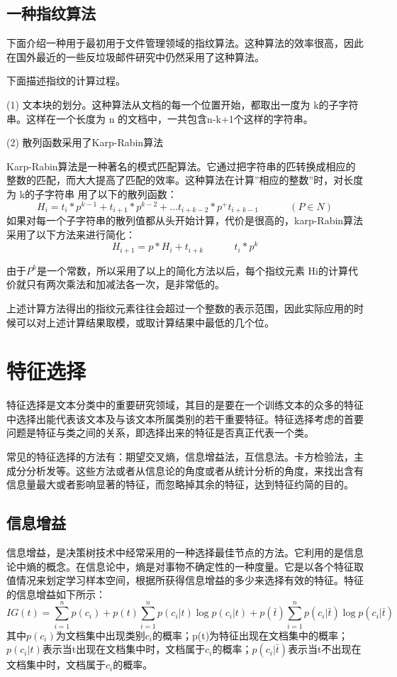 \subsection{一种指纹算法}

下面介绍一种用于最初用于文件管理领域的指纹算法。这种算法的效率很高，因此在国外最近的一些反垃圾邮件研究中仍然采用了这种算法。

下面描述指纹的计算过程。

 (1) 文本块的划分。这种算法从文档的每一个位置开始，都取出一度为 k的子字符串。这样在一个长度为 n 的文档中，一共包含n-k+1个这样的字符串。
 
(2) 散列函数采用了Karp-Rabin算法\cite{Karp1987Efficient}

  Karp-Rabin算法是一种著名的模式匹配算法。它通过把字符串的匹转换成相应的整数的匹配，而大大提高了匹配的效率。这种算法在计算”相应的整数”时，对长度为 k的子字符串 用了以下的散列函数：
\begin{equation}
 H_i=t_i*p^{k-1}+t_{i+1}*p^{k-2}+...t_{i+k-2}*p^+t_{i+k-1} ~~~~~~~~~~~~~~(P\in N)
\end{equation}
如果对每一个子字符串的散列值都从头开始计算，代价是很高的，karp-Rabin算法采用了以下方法来进行简化：
\begin{equation}
 H_{i+1}=p*H_i+t_{i+k} ~~~~~~~~~~~~~~t_i*p^k
\end{equation}

由于$P^k$是一个常数，所以采用了以上的简化方法以后，每个指纹元素 Hi的计算代价就只有两次乘法和加减法各一次，是非常低的。

 上述计算方法得出的指纹元素往往会超过一个整数的表示范围，因此实际应用的时候可以对上述计算结果取模，或取计算结果中最低的几个位。
\section{特征选择}
特征选择是文本分类中的重要研究领域，其目的是要在一个训练文本的众多的特征中选择出能代表该文本及与该文本所属类别的若干重要特征。特征选择考虑的首要问题是特征与类之间的关系，即选择出来的特征是否真正代表一个类。

  常见的特征选择的方法有：期望交叉熵，信息增益法，互信息法。卡方检验法，主成分分析发等。这些方法或者从信息论的角度或者从统计分析的角度，来找出含有信息量最大或者影响显著的特征，而忽略掉其余的特征，达到特征约简的目的。
\subsection{信息增益}
信息增益，是决策树技术中经常采用的一种选择最佳节点的方法。它利用的是信息论中熵的概念。在信息论中，熵是对事物不确定性的一种度量。它是以各个特征取值情况来划定学习样本空间，根据所获得信息增益的多少来选择有效的特征。特征的信息增益如下所示：
\begin{equation}
 IG(t)=\sum_{i=1}^{n}p(c_i)+p(t)\sum_{i=1}^{n}p(c_i|t)\log p(c_i|t)+p(\bar{t})\sum_{i=1}^{n}p(c_i|\bar{t})\log p(c_i|\bar{t})
\end{equation}
其中$p(c_i)$为文档集中出现类别$c_i$的概率；p(t)为特征出现在文档集中的概率；$p(c_i|t)$表示当t出现在文档集中时，文档属于$c_i$的概率；$p(c_i|\bar{t})$表示当t不出现在文档集中时，文档属于$c_i$的概率。

